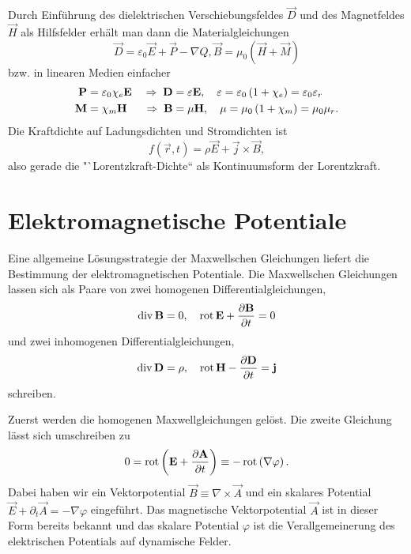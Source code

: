 Durch Einführung des dielektrischen Verschiebungsfeldes $\vec {D}$ und des Magnetfeldes $\vec {H}$ als Hilfsfelder erhält man dann die Materialgleichungen
\begin{equation*}
	\vec {D}=\varepsilon _{0}\vec {E}+\vec {P}-\nabla Q, \vec {B}=\mu _{0}\left(\vec {H}+\vec {M}\right)
\end{equation*}
bzw. in linearen Medien einfacher
\begin{align*}
	\mathbf{P} & =\varepsilon _{0}\chi _{e}\mathbf{E} & \;\Rightarrow\; \mathbf{D} & =\varepsilon \mathbf{E},\quad \varepsilon =\varepsilon _{0}\left(1+\chi _{e}\right)=\varepsilon _{0}\varepsilon _{r} \\
	\mathbf{M} & =\chi _{m}\mathbf{H}                 & \;\Rightarrow\; \mathbf{B} & =\mu \mathbf{H},\quad \mu =\mu _{0}\left(1+\chi _{m}\right)=\mu _{0}\mu _{r}.
\end{align*}
Die Kraftdichte auf Ladungsdichten und Stromdichten ist
\begin{equation*}
	f\left(\vec {r},t\right)=\rho \vec {E}+\vec {j}\times \vec {B},
\end{equation*}
also gerade die "`Lorentzkraft-Dichte`` als Kontinuumsform der Lorentzkraft.

\section{Elektromagnetische Potentiale}

Eine allgemeine Lösungsstrategie der Maxwellschen Gleichungen liefert die Bestimmung der elektromagnetischen Potentiale. Die Maxwellschen Gleichungen lassen sich als Paare von zwei homogenen Differentialgleichungen,
\begin{equation*}
	\operatorname{div} \mathbf{B}=0, \quad\operatorname{rot} \mathbf{E}+\frac{\partial \mathbf{B}}{\partial t}=0
\end{equation*}
und zwei inhomogenen Differentialgleichungen,
\begin{equation*}
	\operatorname{div} \mathbf{D}=\rho ,\quad \operatorname{rot} \mathbf{H}-\frac{\partial \mathbf{D}}{\partial t}=\mathbf{j}
\end{equation*}
schreiben.

Zuerst werden die homogenen Maxwellgleichungen gelöst. Die zweite Gleichung lässt sich umschreiben zu
\begin{equation*}
	0=\operatorname{rot} \left(\mathbf{E}+\frac{\partial \mathbf{A}}{\partial t}\right)\equiv -\operatorname{rot} \left(\nabla \varphi \right).
\end{equation*}
Dabei haben wir ein Vektorpotential $\vec {B}\equiv \nabla \times \vec {A}$ und ein skalares Potential $\vec {E}+\partial _{t}\vec {A}=-\nabla \varphi $ eingeführt. Das magnetische Vektorpotential $\vec {A}$ ist in dieser Form bereits bekannt und das skalare Potential $\varphi $ ist die Verallgemeinerung des elektrischen Potentials auf dynamische Felder.

